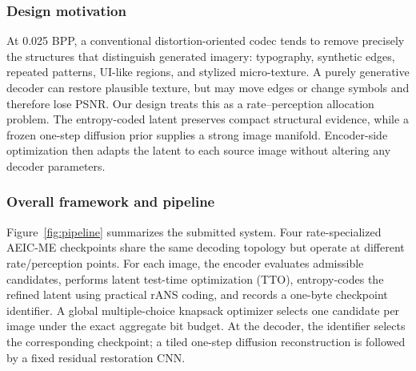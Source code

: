 \documentclass[10pt,twocolumn,letterpaper]{article}
\begin{document}
\subsubsection{Design motivation}
At 0.025 BPP, a conventional distortion-oriented codec tends to remove precisely the structures that distinguish generated imagery: typography, synthetic edges, repeated patterns, UI-like regions, and stylized micro-texture. A purely generative decoder can restore plausible texture, but may move edges or change symbols and therefore lose PSNR. Our design treats this as a rate--perception allocation problem. The entropy-coded latent preserves compact structural evidence, while a frozen one-step diffusion prior supplies a strong image manifold. Encoder-side optimization then adapts the latent to each source image without altering any decoder parameters.

\subsubsection{Overall framework and pipeline}
Figure~\ref{fig:pipeline} summarizes the submitted system. Four rate-specialized AEIC-ME checkpoints share the same decoding topology but operate at different rate/perception points. For each image, the encoder evaluates admissible candidates, performs latent test-time optimization (TTO), entropy-codes the refined latent using practical rANS coding, and records a one-byte checkpoint identifier. A global multiple-choice knapsack optimizer selects one candidate per image under the exact aggregate bit budget. At the decoder, the identifier selects the corresponding checkpoint; a tiled one-step diffusion reconstruction is followed by a fixed residual restoration CNN.
\end{document}
